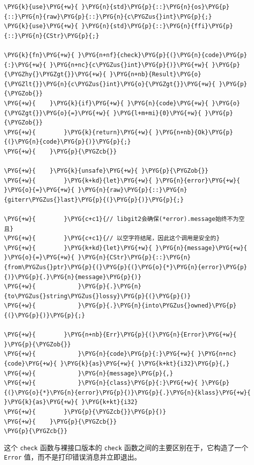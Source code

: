 \begin{Verbatim}[commandchars=\\\{\},breaklines=true,breakanywhere=true,fontsize=\codefont,xleftmargin=17bp]
\PYG{k}{use}\PYG{+w}{ }\PYG{n}{std}\PYG{p}{::}\PYG{n}{os}\PYG{p}{::}\PYG{n}{raw}\PYG{p}{::}\PYG{n}{c\PYGZus{}int}\PYG{p}{;}
\PYG{k}{use}\PYG{+w}{ }\PYG{n}{std}\PYG{p}{::}\PYG{n}{ffi}\PYG{p}{::}\PYG{n}{CStr}\PYG{p}{;}

\PYG{k}{fn}\PYG{+w}{ }\PYG{n+nf}{check}\PYG{p}{(}\PYG{n}{code}\PYG{p}{:}\PYG{+w}{ }\PYG{n+nc}{c\PYGZus{}int}\PYG{p}{)}\PYG{+w}{ }\PYG{p}{\PYGZhy{}\PYGZgt{}}\PYG{+w}{ }\PYG{n+nb}{Result}\PYG{o}{\PYGZlt{}}\PYG{n}{c\PYGZus{}int}\PYG{o}{\PYGZgt{}}\PYG{+w}{ }\PYG{p}{\PYGZob{}}
\PYG{+w}{    }\PYG{k}{if}\PYG{+w}{ }\PYG{n}{code}\PYG{+w}{ }\PYG{o}{\PYGZgt{}}\PYG{o}{=}\PYG{+w}{ }\PYG{l+m+mi}{0}\PYG{+w}{ }\PYG{p}{\PYGZob{}}
\PYG{+w}{        }\PYG{k}{return}\PYG{+w}{ }\PYG{n+nb}{Ok}\PYG{p}{(}\PYG{n}{code}\PYG{p}{)}\PYG{p}{;}
\PYG{+w}{    }\PYG{p}{\PYGZcb{}}

\PYG{+w}{    }\PYG{k}{unsafe}\PYG{+w}{ }\PYG{p}{\PYGZob{}}
\PYG{+w}{        }\PYG{k+kd}{let}\PYG{+w}{ }\PYG{n}{error}\PYG{+w}{ }\PYG{o}{=}\PYG{+w}{ }\PYG{n}{raw}\PYG{p}{::}\PYG{n}{giterr\PYGZus{}last}\PYG{p}{(}\PYG{p}{)}\PYG{p}{;}

\PYG{+w}{        }\PYG{c+c1}{// libgit2会确保(*error).message始终不为空且}
\PYG{+w}{        }\PYG{c+c1}{// 以空字符结尾，因此这个调用是安全的}
\PYG{+w}{        }\PYG{k+kd}{let}\PYG{+w}{ }\PYG{n}{message}\PYG{+w}{ }\PYG{o}{=}\PYG{+w}{ }\PYG{n}{CStr}\PYG{p}{::}\PYG{n}{from\PYGZus{}ptr}\PYG{p}{(}\PYG{p}{(}\PYG{o}{*}\PYG{n}{error}\PYG{p}{)}\PYG{p}{.}\PYG{n}{message}\PYG{p}{)}
\PYG{+w}{            }\PYG{p}{.}\PYG{n}{to\PYGZus{}string\PYGZus{}lossy}\PYG{p}{(}\PYG{p}{)}
\PYG{+w}{            }\PYG{p}{.}\PYG{n}{into\PYGZus{}owned}\PYG{p}{(}\PYG{p}{)}\PYG{p}{;}

\PYG{+w}{        }\PYG{n+nb}{Err}\PYG{p}{(}\PYG{n}{Error}\PYG{+w}{ }\PYG{p}{\PYGZob{}}
\PYG{+w}{            }\PYG{n}{code}\PYG{p}{:}\PYG{+w}{ }\PYG{n+nc}{code}\PYG{+w}{ }\PYG{k}{as}\PYG{+w}{ }\PYG{k+kt}{i32}\PYG{p}{,}
\PYG{+w}{            }\PYG{n}{message}\PYG{p}{,}
\PYG{+w}{            }\PYG{n}{class}\PYG{p}{:}\PYG{+w}{ }\PYG{p}{(}\PYG{o}{*}\PYG{n}{error}\PYG{p}{)}\PYG{p}{.}\PYG{n}{klass}\PYG{+w}{ }\PYG{k}{as}\PYG{+w}{ }\PYG{k+kt}{i32}
\PYG{+w}{        }\PYG{p}{\PYGZcb{}}\PYG{p}{)}
\PYG{+w}{    }\PYG{p}{\PYGZcb{}}
\PYG{p}{\PYGZcb{}}
\end{Verbatim}

这个 \texttt{check} 函数与裸接口版本的 \texttt{check} 函数之间的主要区别在于，它构造了一个 \texttt{Error} 值，而不是打印错误消息并立即退出。

